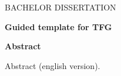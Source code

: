 \cleardoublepage %





\makeatletter
\begin{center} %
   {\textsc{BACHELOR DISSERTATION}\par}
   \vspace{1cm} %
   {\textbf{\Large Guided template for TFG}\par}
   \vspace{0.4cm} %
   {\@autor \par} 
   \vspace{0.9cm} %
   {\textbf{\large\textsf{Abstract}}\par} 
\end{center}   
\makeatother %
Abstract (english version).
\cleardoublepage %

